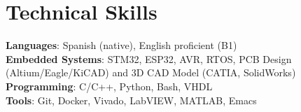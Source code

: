 \section{Technical Skills}
\begin{itemize}[leftmargin=0.15in, label={}]
  \small{\item{
    \textbf{Languages}{: Spanish (native), English proficient (B1)} \\
    \textbf{Embedded Systems}{: STM32, ESP32, AVR, RTOS, PCB Design (Altium/Eagle/KiCAD) and 3D CAD Model (CATIA, SolidWorks)} \\
    \textbf{Programming}{: C/C++, Python, Bash, VHDL} \\
    \textbf{Tools}{: Git, Docker, Vivado, LabVIEW, MATLAB, Emacs}
  }}
\end{itemize}
